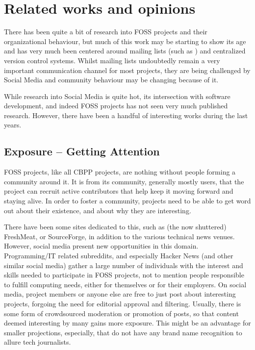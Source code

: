 \documentclass[a4paper,11pt]{article} %
\begin{document}
\section{Related works and opinions}
There has been quite a bit of research into FOSS projects and their
organizational behaviour, but much of this work may be starting to show its
age and has very much been centered around mailing lists (such as
\cite{Oezbek10Cancer, singh2011network}) and centralized version control
systems. Whilst mailing lists undoubtedly remain a very important
communication channel for most projects, they are being challenged by Social
Media and community behaviour may be changing because of it.

While research into Social Media is quite hot, its intersection with
software development, and indeed FOSS projects has not seen very much
published research. However, there have been a handful of interesting works
during the last years.

\subsection{Exposure -- Getting Attention}
FOSS projects, like all CBPP projects, are nothing without people
forming a community around it. It is from its community, generally
mostly users, that the project can recruit active contributors that
help keep it moving forward and staying alive. In order to foster a
community, projects need to be able to get word out about their
existence, and about why they are interesting.

There have been some sites dedicated to this, such as (the now
shuttered) FreshMeat, or SourceForge, in addition to the various
technical news venues. However, social media present new opportunities
in this domain. Programming/IT related subreddits, and especially
Hacker News (and other similar social media) gather a large number of
individuals with the interest and skills needed to participate in FOSS
projects, not to mention people responsible to fulfill computing
needs, either for themselves or for their employers.  On social media,
project members or anyone else are free to just post about interesting
projects, forgoing the need for editorial approval and
filtering. Usually, there is some form of crowdsourced moderation or
promotion of posts, so that content deemed interesting by many gains
more exposure. This might be an advantage for smaller projections,
especially, that do not have any brand name recognition to allure tech
journalists.
\end{document}
